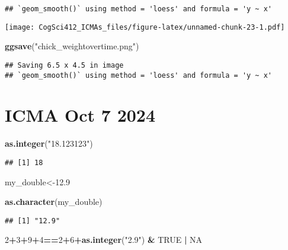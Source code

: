 \documentclass[
]{article}
\newenvironment{Shaded}{\begin{snugshade}}{\end{snugshade}}
\newcommand{\ConstantTok}[1]{\textcolor[rgb]{0.56,0.35,0.01}{#1}}
\newcommand{\DecValTok}[1]{\textcolor[rgb]{0.00,0.00,0.81}{#1}}
\newcommand{\FloatTok}[1]{\textcolor[rgb]{0.00,0.00,0.81}{#1}}
\newcommand{\FunctionTok}[1]{\textcolor[rgb]{0.13,0.29,0.53}{\textbf{#1}}}
\newcommand{\NormalTok}[1]{#1}
\newcommand{\OtherTok}[1]{\textcolor[rgb]{0.56,0.35,0.01}{#1}}
\newcommand{\SpecialCharTok}[1]{\textcolor[rgb]{0.81,0.36,0.00}{\textbf{#1}}}
\newcommand{\StringTok}[1]{\textcolor[rgb]{0.31,0.60,0.02}{#1}}
\begin{document}
\begin{verbatim}
## `geom_smooth()` using method = 'loess' and formula = 'y ~ x'
\end{verbatim}

\texttt{[image: CogSci412\_ICMAs\_files/figure-latex/unnamed-chunk-23-1.pdf]}

\begin{Shaded}
\begin{Highlighting}[]
\FunctionTok{ggsave}\NormalTok{(}\StringTok{"chick\_weightovertime.png"}\NormalTok{)}
\end{Highlighting}
\end{Shaded}

\begin{verbatim}
## Saving 6.5 x 4.5 in image
## `geom_smooth()` using method = 'loess' and formula = 'y ~ x'
\end{verbatim}

\section{ICMA Oct 7 2024}\label{icma-oct-7-2024}

\begin{Shaded}
\begin{Highlighting}[]
\FunctionTok{as.integer}\NormalTok{(}\StringTok{"18.123123"}\NormalTok{)}
\end{Highlighting}
\end{Shaded}

\begin{verbatim}
## [1] 18
\end{verbatim}

\begin{Shaded}
\begin{Highlighting}[]
\NormalTok{my\_double}\OtherTok{\textless{}{-}}\FloatTok{12.9}
\end{Highlighting}
\end{Shaded}

\begin{Shaded}
\begin{Highlighting}[]
\FunctionTok{as.character}\NormalTok{(my\_double)}
\end{Highlighting}
\end{Shaded}

\begin{verbatim}
## [1] "12.9"
\end{verbatim}

\begin{Shaded}
\begin{Highlighting}[]
\DecValTok{2}\SpecialCharTok{+}\DecValTok{3}\SpecialCharTok{+}\DecValTok{9}\SpecialCharTok{+}\DecValTok{4}\SpecialCharTok{==}\DecValTok{2}\SpecialCharTok{+}\DecValTok{6}\SpecialCharTok{+}\FunctionTok{as.integer}\NormalTok{(}\StringTok{"2.9"}\NormalTok{) }\SpecialCharTok{\&} \ConstantTok{TRUE} \SpecialCharTok{|} \ConstantTok{NA}
\end{Highlighting}
\end{Shaded}
\end{document}
